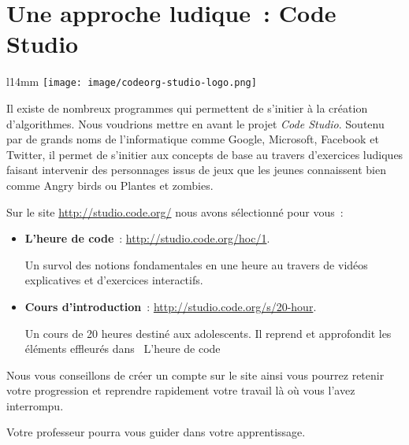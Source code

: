 \chapter{Une approche ludique~: Code Studio}

	\begin{wrapfigure}{l}{14mm}
	\vskip-4mm
	\texttt{[image: image/codeorg-studio-logo.png]}
	\vskip-2mm
	\end{wrapfigure}
	
	Il existe de nombreux programmes 
	qui permettent de s’initier à la création d’algorithmes.
	Nous voudrions mettre en avant le projet \emph{Code Studio}.
	Soutenu par de grands noms de l’informatique 
	comme \textsf{Google}, \textsf{Microsoft}, 
	\textsf{Facebook} et \textsf{Twitter},
	il permet de s’initier aux concepts de base
	au travers d’exercices ludiques faisant intervenir 
	des personnages issus de jeux que les jeunes connaissent bien 
	comme \textsf{Angry birds} ou \textsf{Plantes et zombies}.
	
	Sur le site \url{http://studio.code.org/} 
	nous avons sélectionné pour vous~:

	\begin{itemize}
	\item
		\textbf{L’heure de code}~: 
		\url{http://studio.code.org/hoc/1}.
		
		Un survol des notions fondamentales en une heure
		au travers de vidéos explicatives et d’exercices interactifs.
	\item
		\textbf{Cours d’introduction}~: 
		\url{http://studio.code.org/s/20-hour}.
		
		Un cours de 20 heures destiné aux adolescents.
		Il reprend et approfondit les éléments effleurés dans
		\og\ L’heure de code\fg	
	\end{itemize}
	
	Nous vous conseillons de créer un compte sur le site
	ainsi vous pourrez retenir votre progression
	et reprendre rapidement votre travail là où vous l’avez
	interrompu.
	
	Votre professeur pourra vous guider dans votre apprentissage.
	
